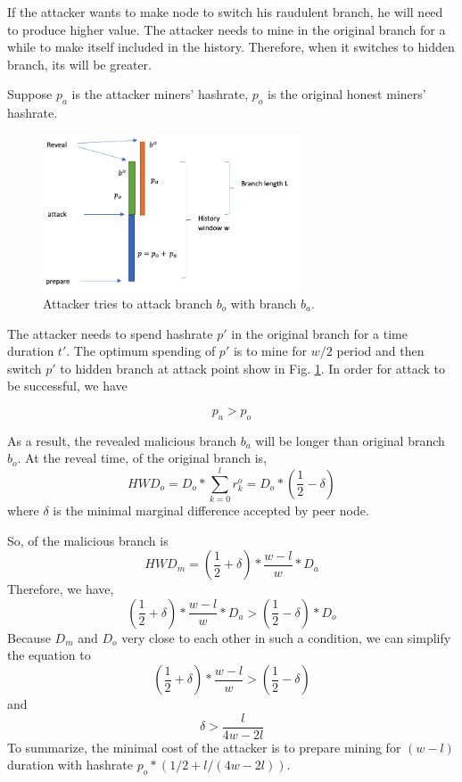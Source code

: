\documentclass[conference]{IEEEtran}
\begin{document}
If the attacker wants to make node to switch his raudulent branch, he will need to produce higher  value. The attacker needs to mine in the original branch for a while to make itself included in the history. Therefore, when it switches to hidden branch, its  will be greater. 

Suppose $p_a$ is the attacker miners' hashrate, $p_o$ is the original honest miners' hashrate.

\begin{figure}[htbp]
\centerline{\includegraphics[width=3in]{figure.png}}
\caption{Attacker tries to attack branch $b_o$ with branch $b_a$.}
\label{fig1}
\end{figure}

The attacker needs to spend hashrate $p'$ in the original branch for a time duration $t'$. The optimum spending of $p'$ is to mine for $w/2$ period and then switch $p'$ to hidden branch at attack point show in Fig. \ref{fig1}. In order for attack to be successful, we have

\begin{equation}
    p_a > p_o\label{eq_hash_power}
\end{equation}

As a result, the revealed malicious branch $b_a$ will be longer than original branch $b_o$. 
At the reveal time,  of the original branch is,
\begin{equation}
    H\!W\!D_o = D_o * \sum_{k=0}^{l} r_{k}^{o} =  D_o * (\frac{1}{2} - \delta)\label{eq_hwd_orig}
\end{equation}
where $\delta$ is the minimal marginal difference accepted by peer node. 

So,  of the malicious branch is
\begin{equation}
    H\!W\!D_m= (\frac{1}{2} + \delta) * \frac{w-l}{w} * D_a\label{eq_hwd_mal}
\end{equation}
Therefore, we have,
\begin{equation}
    (\frac{1}{2} + \delta) * \frac{w-l}{w} * D_a> (\frac{1}{2}-\delta) * D_o\label{eq_hwd_criteria}
\end{equation}
Because $D_m$ and $D_o$ very close to each other in such a condition, we can simplify the equation to 
\begin{equation}
    (\frac{1}{2} + \delta) * \frac{w-l}{w} > (\frac{1}{2}-\delta)\label{eq_hwd_crit_simplified}
\end{equation}
and
\begin{equation}
\delta>\frac{l}{4w-2l}\label{eq_delta}
\end{equation}
To summarize, the minimal cost of the attacker is to prepare mining for $(w-l)$ duration with hashrate $p_o *(1/2+l/(4w-2l))$.
\end{document}
